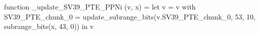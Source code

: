 function _update_SV39_PTE_PPNi (v, x) = let v = { v with SV39_PTE_chunk_0 = update_subrange_bits(v.SV39_PTE_chunk_0, 53, 10, subrange_bits(x, 43, 0)) } in
  v
